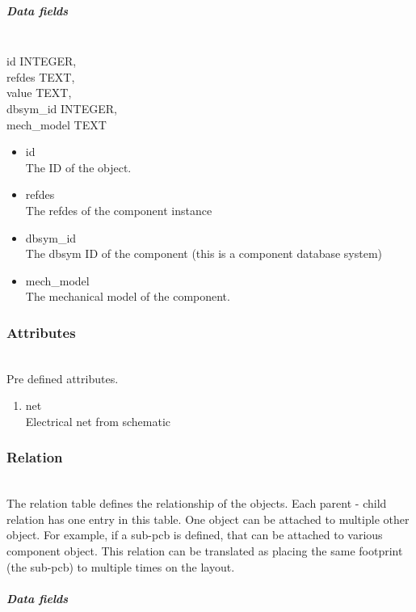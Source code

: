 \documentclass[12pt]{article}
\begin{document}
\subparagraph{Data fields}

\mbox{}\\

id INTEGER,\\
refdes TEXT,\\
value TEXT,\\
dbsym\_id INTEGER,\\
mech\_model TEXT

\begin{itemize}
\item id\\
The ID of the object.
\item refdes\\
The refdes of the component instance
\item dbsym\_id\\
The dbsym ID of the component (this is a component database system)
\item mech\_model\\
The mechanical model of the component.
\end{itemize}


\subsubsection{Attributes}\label{attributes}

\mbox{}\\

Pre defined attributes.

\begin{enumerate}
\item
  net\\ Electrical net from schematic
\end{enumerate}

\subsubsection{Relation}\label{relation}

\mbox{}\\

The relation table defines the relationship of the objects. Each parent -
child relation has one entry in this table. One object can be attached to
multiple other object. For example, if a sub-pcb is defined, that can be
attached to various component object. This relation can be translated as
placing the same footprint (the sub-pcb) to multiple times on the layout.

\subparagraph{Data fields}
\end{document}
